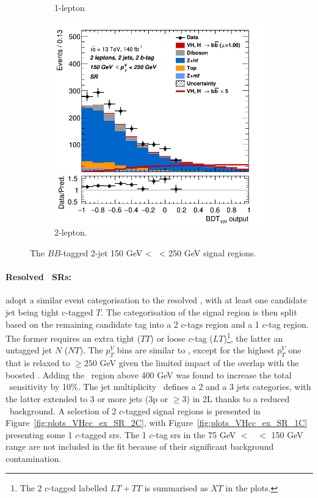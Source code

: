 \begin{figure}[h!]
\begin{subfigure}[b]{0.32\textwidth}
      \caption{1-lepton}
      \label{fig:plots_VHbb_ex_1L_SR}
  \end{subfigure}
  \begin{subfigure}[b]{0.32\textwidth}
    \centering
    \includegraphics[width=\textwidth]{Images/VH/Own_fit/prefit_VHbb/Region_distmva_BMax250_BMin150_DSR_J2_TTypebb_T2_L2_Y6051_Prefit.png}
    \caption{2-lepton.}
    \label{fig:plots_VHbb_ex_2L_SR}
\end{subfigure}
  \caption{The $BB$-tagged 2-jet 150 GeV < \ptv\ < 250 GeV signal regions.}
  \label{fig:plots_VHbb_ex_SR}
\end{figure} 

\paragraph{Resolved \boldvhc\ SRs:} adopt a similar event categorisation to the resolved \vhb, with at least one candidate jet being tight c-tagged $T$. The categorisation of the signal region is then split based on the remaining candidate tag into a 2 $c$-tags region and a 1 $c$-tag region. The former requires an extra tight ($TT$) or loose $c$-tag ($LT$)\footnote{The 2 $c$-tagged labelled $LT+TT$ is summarised as $XT$ in the plots.}, the latter an untagged jet $N$ ($NT$). The $p_T^V$ bins are similar to \vhb, except for the highest $p_T^V$ one that is relaxed to $\geq 250$ GeV given the limited impact of the overlap with the boosted \vhb. Adding the \ptv\ region above 400 GeV was found to increase the total \vhc\ sensitivity by 10\%. The jet multiplicity \nj\ defines a 2 and a 3 jets categories, with the latter extended to 3 or more jets (3p or $\geq$3) in 2L thanks to a reduced \ttb\ background. A selection of 2 $c$-tagged signal regions is presented in Figure~\ref{fig:plots_VHcc_ex_SR_2C}, with Figure~\ref{fig:plots_VHcc_ex_SR_1C} presenting some 1 $c$-tagged \glspl{sr}. The 1 $c$-tag \glspl{sr} in the 75 GeV $<$ \ptv\ $<$ 150 GeV range are not included in the fit because of their significant background contamination.

